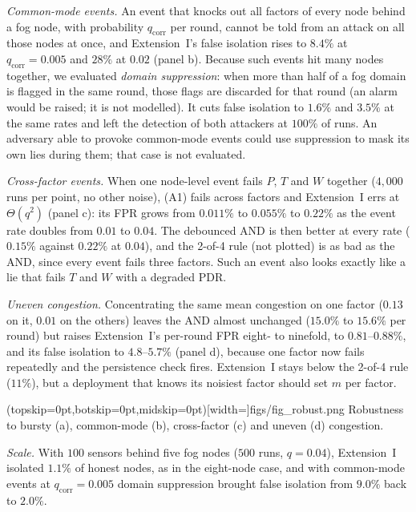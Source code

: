 \documentclass{ieeeaccess}
\begin{document}
\emph{Common-mode events.}  An event that knocks out all factors of
every node behind a fog node, with probability $q_{\mathrm{corr}}$ per
round, cannot be told from an attack on all those nodes at once, and
Extension~I's false isolation rises to $8.4\%$ at
$q_{\mathrm{corr}}=0.005$ and $28\%$ at $0.02$ (panel b).  Because such
events hit many nodes together, we evaluated \emph{domain
suppression}: when more than half of a fog domain is flagged in the
same round, those flags are discarded for that round (an alarm would
be raised; it is not modelled).  It cuts
false isolation to $1.6\%$ and $3.5\%$ at the same rates and left the
detection of both attackers at $100\%$ of runs.  An adversary able to provoke
common-mode events could use suppression to mask its own lies during
them; that case is not evaluated.

\emph{Cross-factor events.}  When one node-level event fails $P$, $T$
and $W$ together ($4{,}000$ runs per point, no other noise), (A1) fails
across factors and Extension~I errs at $\Theta(q^{2})$ (panel c): its
FPR grows from $0.011\%$ to $0.055\%$ to $0.22\%$ as the event rate
doubles from $0.01$ to $0.04$.  The debounced AND is then better
at every rate ($0.15\%$ against $0.22\%$ at $0.04$), and the 2-of-4 rule (not plotted) is as bad
as the AND, since every event fails three factors.  Such an event also
looks exactly like a lie that fails $T$ and $W$ with a degraded PDR.

\emph{Uneven congestion.}  Concentrating the same mean congestion on
one factor ($0.13$ on it, $0.01$ on the others) leaves the AND
almost unchanged ($15.0\%$ to $15.6\%$ per round) but raises Extension~I's per-round FPR eight- to ninefold, to
$0.81$--$0.88\%$, and its false isolation to $4.8$--$5.7\%$ (panel d),
because one factor now fails repeatedly and the persistence check
fires.  Extension~I stays below the 2-of-4 rule ($11\%$), but a
deployment that knows its noisiest factor should set $m$ per factor.

\Figure[!t](topskip=0pt,botskip=0pt,midskip=0pt)[width=\textwidth]{figs/fig_robust.png}
{Robustness to bursty (a), common-mode (b), cross-factor (c) and uneven (d) congestion.\label{fig:robust}}

\emph{Scale.}  With $100$ sensors behind five fog nodes ($500$ runs, $q=0.04$),
Extension~I isolated $1.1\%$ of honest nodes, as in the eight-node
case, and with common-mode events at $q_{\mathrm{corr}}=0.005$ domain
suppression brought false isolation from $9.0\%$ back to $2.0\%$.

\end{document}
